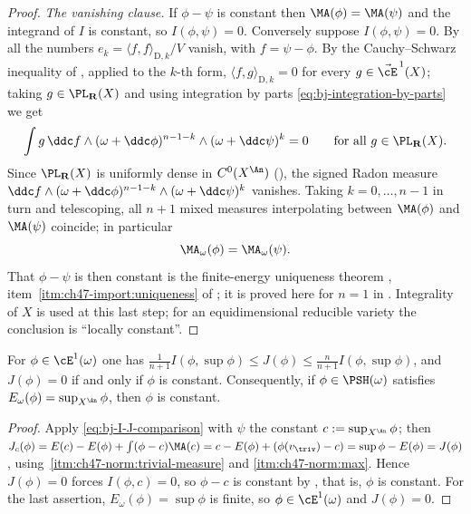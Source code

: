 \begin{proof}
\emph{The vanishing clause.}  If $\phi-\psi$ is constant then
$\MA(\phi)=\MA(\psi)$ and the integrand of $I$ is constant, so
$I(\phi,\psi)=0$.  Conversely suppose $I(\phi,\psi)=0$.  By
 all the numbers
$e_k=\langle f,f\rangle_{\mathrm D,k}/V$ vanish, with $f=\psi-\phi$.
By the Cauchy--Schwarz inequality of , applied
to the $k$-th form, $\langle f,g\rangle_{\mathrm D,k}=0$ for every
$g\in\vec\cE^{\,1}(X)$; taking $g\in\PL_{\mathbf R}(X)$ and using
integration by parts \eqref{eq:bj-integration-by-parts} we get
\[
 \int g\,\ddc f\wedge(\omega+\ddc\phi)^{n-1-k}\wedge(\omega+\ddc\psi)^{k}=0
 \qquad\text{for all }g\in\PL_{\mathbf R}(X).
\]
Since $\PL_{\mathbf R}(X)$ is uniformly dense in $C^0(X^{\An})$
(), the signed Radon measure
$\ddc f\wedge(\omega+\ddc\phi)^{n-1-k}\wedge(\omega+\ddc\psi)^{k}$
vanishes.  Taking $k=0,\dots,n-1$ in turn and telescoping, all $n+1$
mixed measures interpolating between $\MA(\phi)$ and $\MA(\psi)$
coincide; in particular
\[
 \MA_\omega(\phi)=\MA_\omega(\psi).
\]
That $\phi-\psi$ is then constant is the finite-energy uniqueness theorem
\cite[Corollary~10.4]{BJ22}, item~\cref{itm:ch47-import:uniqueness} of
; it is proved here for $n=1$ in
.  Integrality of $X$ is used at this
last step; for an equidimensional reducible variety the conclusion is
``locally constant''.
\end{proof}

\begin{corollary}
\label{cor:ch47-J-vanishes}
For $\phi\in\cE^1(\omega)$ one has
$\tfrac1{n+1}I(\phi,\sup\phi)\le J(\phi)\le\tfrac n{n+1}I(\phi,\sup\phi)$,
and $J(\phi)=0$ if and only if $\phi$ is constant.  Consequently, if
$\phi\in\PSH(\omega)$ satisfies $E_\omega(\phi)=\sup_{X^{\An}}\phi$,
then $\phi$ is constant.
\end{corollary}

\begin{proof}
Apply \eqref{eq:bj-I-J-comparison} with $\psi$ the constant
$c:=\sup_{X^{\An}}\phi$; then
$J_c(\phi)=E(c)-E(\phi)+\int(\phi-c)\MA(c)=c-E(\phi)+(\phi(v_{\triv})-c)
=\sup\phi-E(\phi)=J(\phi)$,
using \,\cref{itm:ch47-norm:trivial-measure}
and \cref{itm:ch47-norm:max}.  Hence $J(\phi)=0$ forces
$I(\phi,c)=0$, so $\phi-c$ is constant by
, that is, $\phi$ is constant.  For the
last assertion, $E_\omega(\phi)=\sup\phi$ is finite, so
$\phi\in\cE^1(\omega)$ and $J(\phi)=0$.
\end{proof}

